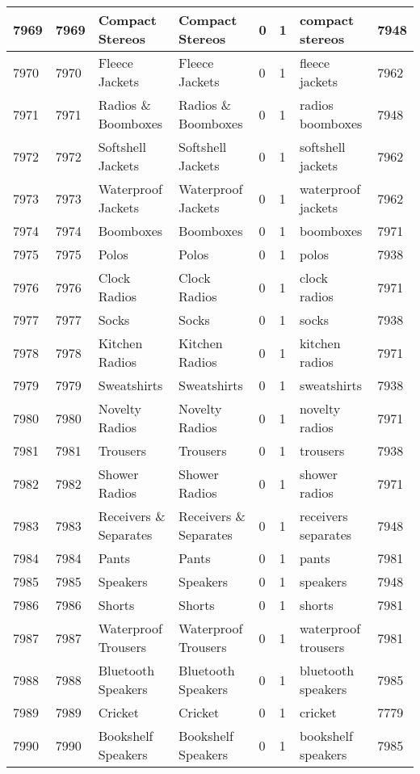 \begin{longtable}{|l|l|l|l|l|l|l|l|}
7969 & 7969 & Compact Stereos & Compact Stereos & 0 & 1 & compact stereos & 7948 \\ \hline 
7970 & 7970 & Fleece Jackets & Fleece Jackets & 0 & 1 & fleece jackets & 7962 \\ \hline 
7971 & 7971 & Radios \& Boomboxes & Radios \& Boomboxes & 0 & 1 & radios boomboxes & 7948 \\ \hline 
7972 & 7972 & Softshell Jackets & Softshell Jackets & 0 & 1 & softshell jackets & 7962 \\ \hline 
7973 & 7973 & Waterproof Jackets & Waterproof Jackets & 0 & 1 & waterproof jackets & 7962 \\ \hline 
7974 & 7974 & Boomboxes & Boomboxes & 0 & 1 & boomboxes & 7971 \\ \hline 
7975 & 7975 & Polos & Polos & 0 & 1 & polos & 7938 \\ \hline 
7976 & 7976 & Clock Radios & Clock Radios & 0 & 1 & clock radios & 7971 \\ \hline 
7977 & 7977 & Socks & Socks & 0 & 1 & socks & 7938 \\ \hline 
7978 & 7978 & Kitchen Radios & Kitchen Radios & 0 & 1 & kitchen radios & 7971 \\ \hline 
7979 & 7979 & Sweatshirts & Sweatshirts & 0 & 1 & sweatshirts & 7938 \\ \hline 
7980 & 7980 & Novelty Radios & Novelty Radios & 0 & 1 & novelty radios & 7971 \\ \hline 
7981 & 7981 & Trousers & Trousers & 0 & 1 & trousers & 7938 \\ \hline 
7982 & 7982 & Shower Radios & Shower Radios & 0 & 1 & shower radios & 7971 \\ \hline 
7983 & 7983 & Receivers \& Separates & Receivers \& Separates & 0 & 1 & receivers separates & 7948 \\ \hline 
7984 & 7984 & Pants & Pants & 0 & 1 & pants & 7981 \\ \hline 
7985 & 7985 & Speakers & Speakers & 0 & 1 & speakers & 7948 \\ \hline 
7986 & 7986 & Shorts & Shorts & 0 & 1 & shorts & 7981 \\ \hline 
7987 & 7987 & Waterproof Trousers & Waterproof Trousers & 0 & 1 & waterproof trousers & 7981 \\ \hline 
7988 & 7988 & Bluetooth Speakers & Bluetooth Speakers & 0 & 1 & bluetooth speakers & 7985 \\ \hline 
7989 & 7989 & Cricket & Cricket & 0 & 1 & cricket & 7779 \\ \hline 
7990 & 7990 & Bookshelf Speakers & Bookshelf Speakers & 0 & 1 & bookshelf speakers & 7985 \\ \hline 

\end{longtable}
